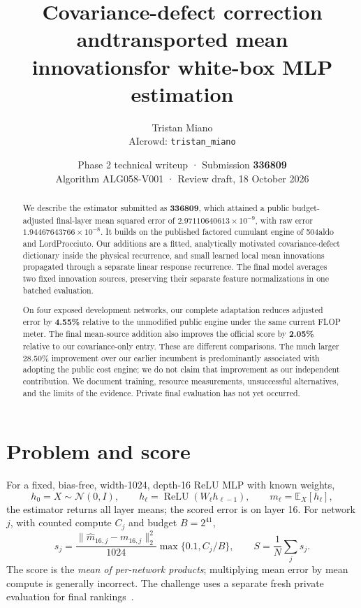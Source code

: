 \documentclass[10pt]{article}
\title{\vspace{-1.5em}\color{ink}\sffamily Covariance-defect correction and\newline transported mean innovations\newline for white-box MLP estimation}
\author{Tristan Miano\\\small AIcrowd: \texttt{tristan\_miano}}
\date{Phase 2 technical writeup · Submission \textbf{336809}\\
\small Algorithm ALG058-V001 · Review draft, 18 October 2026}
\newcommand{\E}{\mathbb E}
\newcommand{\ReLU}{\operatorname{ReLU}}
\begin{document}
\maketitle\thispagestyle{fancy}
\begin{abstract}
We describe the estimator submitted as \textbf{336809}, which attained a public
budget-adjusted final-layer mean squared error of
\(2.97110640613\times10^{-9}\), with raw error
\(1.94467643766\times10^{-8}\). It builds on the published factored cumulant
engine of 504aldo and LordProcciuto. Our additions are a fitted, analytically
motivated covariance-defect dictionary inside the physical recurrence, and
small learned local mean innovations propagated through a separate linear
response recurrence. The final model averages two fixed innovation sources,
preserving their separate feature normalizations in one batched evaluation.

On four exposed development networks, our complete adaptation reduces
adjusted error by \textbf{4.55\%} relative to the unmodified public engine under
the same current FLOP meter. The final mean-source addition also improves the
official score by \textbf{2.05\%} relative to our covariance-only entry. These
are different comparisons. The much larger 28.50\% improvement over our earlier
incumbent is predominantly associated with adopting the public cost engine;
we do not claim that improvement as our independent contribution. We document
training, resource measurements, unsuccessful alternatives, and the limits of
the evidence. Private final evaluation has not yet occurred.
\end{abstract}

\section{Problem and score}
For a fixed, bias-free, width-1024, depth-16 ReLU MLP with known weights,
\begin{equation}
 h_0=X\sim\mathcal N(0,I),\qquad h_\ell=\ReLU(W_\ell h_{\ell-1}),
 \qquad m_\ell=\E_X[h_\ell],
\end{equation}
the estimator returns all layer means; the scored error is on layer 16.
For network \(j\), with counted compute \(C_j\) and budget \(B=2^{41}\),
\begin{equation}\label{eq:score}
 s_j=\frac{\|\widehat m_{16,j}-m_{16,j}\|_2^2}{1024}
       \max\{0.1,C_j/B\},\qquad S=\frac1N\sum_j s_j.
\end{equation}
The score is the \emph{mean of per-network products}; multiplying mean error
by mean compute is generally incorrect. The challenge uses a separate fresh
private evaluation for final rankings~\cite{rules,update}.
\end{document}
